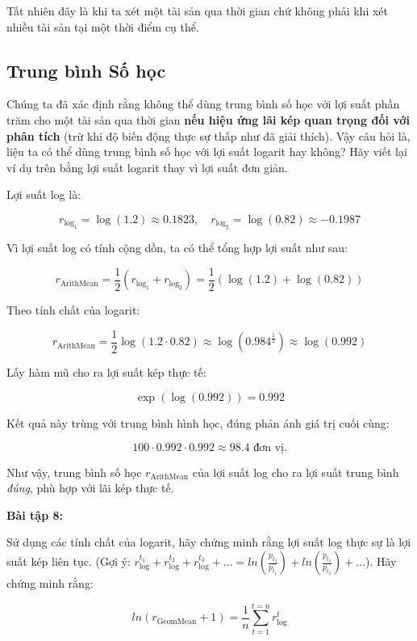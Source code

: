 Tất nhiên đây là khi ta xét một tài sản qua thời gian chứ không phải khi xét nhiều tài sản tại một thời điểm cụ thể.

\subsection{Trung bình Số học}

Chúng ta đã xác định rằng không thể dùng trung bình số học với lợi suất phần trăm cho một tài sản qua thời gian \textbf{nếu hiệu ứng lãi kép quan trọng đối với phân tích} (trừ khi độ biến động thực sự thấp như đã giải thích). Vậy câu hỏi là, liệu ta có thể dùng trung bình số học với lợi suất logarit hay không? Hãy viết lại ví dụ trên bằng lợi suất logarit thay vì lợi suất đơn giản.

Lợi suất log là:

$$
r_{\text{log}_1} = \log(1.2) \approx 0.1823, \quad r_{\text{log}_2} = \log(0.82) \approx -0.1987
$$

Vì lợi suất log có tính cộng dồn, ta có thể tổng hợp lợi suất như sau:

$$
r_{\text{ArithMean}} = \frac{1}{2} \left ( r_{\text{log}_1} + r_{\text{log}_2} \right ) =\frac{1}{2} \left ( \log(1.2) + \log(0.82) \right )
$$

Theo tính chất của logarit:

$$
r_{\text{ArithMean}} = \frac{1}{2} \log(1.2 \cdot 0.82) \approx \log(0.984^{\frac{1}{2}}) \approx \log(0.992)
$$

Lấy hàm mũ cho ra lợi suất kép thực tế:

$$
\exp(\log(0.992)) = 0.992
$$

Kết quả này trùng với trung bình hình học, đúng phản ánh giá trị cuối cùng:

$$
100 \cdot 0.992 \cdot 0.992 \approx 98.4 \text{ đơn vị.}
$$

Như vậy, trung bình số học $r_{\text{ArithMean}}$ của lợi suất log cho ra lợi suất trung bình \emph{đúng}, phù hợp với lãi kép thực tế.

\textbf{Bài tập 8:}

Sử dụng các tính chất của logarit, hãy chứng minh rằng lợi suất log thực sự là lợi suất kép liên tục. (Gợi ý: $r^{t_{1}}_{\text{log}} + r^{t_{2}}_{\text{log}} + r^{t_{3}}_{\text{log}} + \dots = ln \left ( \frac{p_{t_{2}}}{p_{t_{1}}} \right ) + ln \left ( \frac{p_{t_{3}}}{p_{t_{2}}} \right ) + \dots$). Hãy chứng minh rằng:

$$
ln(r_{\text{GeomMean}} + 1) = \frac{1}{n}\sum_{t=1}^{t=n} r^{t}_{\text{log}}
$$


